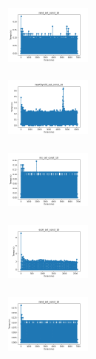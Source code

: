 \begin{figure}[H]
    \hfill
    \begin{subfigure}
        \centering
        \includegraphics[width=0.234\textwidth]{img/am01mej/rand_set_const_10_277451237_time.png}
    \end{subfigure}
    \hfill
    \begin{subfigure}
        \centering
        \includegraphics[width=0.234\textwidth]{img/am01mej/newthyroid_set_const_10_277451237_time.png}
    \end{subfigure}
    \hfill
    \begin{subfigure}
        \centering
        \includegraphics[width=0.234\textwidth]{img/am01mej/iris_set_const_10_49258669_time.png}
    \end{subfigure}
    \hfill
    \begin{subfigure}
        \centering
        \includegraphics[width=0.234\textwidth]{img/am01mej/ecoli_set_const_10_49258669_time.png}
    \end{subfigure}
    \hfill
    \begin{subfigure}
        \centering
        \includegraphics[width=0.234\textwidth]{img/am01mej/rand_set_const_10_49258669_time.png}
    \end{subfigure}
    \hfill
    \begin{subfigure}

\end{subfigure}
\end{figure}
